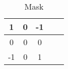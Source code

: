 \begin{enumerate}
  
\begin{table}[h!]
\centering
\begin{tabular}{|c|c|c|c|c|}
\hline
1 & 0 & -1 \\
\hline
0 & 0 & 0 \\
\hline
-1 & 0 & 1 \\
\hline
\end{tabular}
\caption{Mask}
\end{table}
\end{enumerate}


